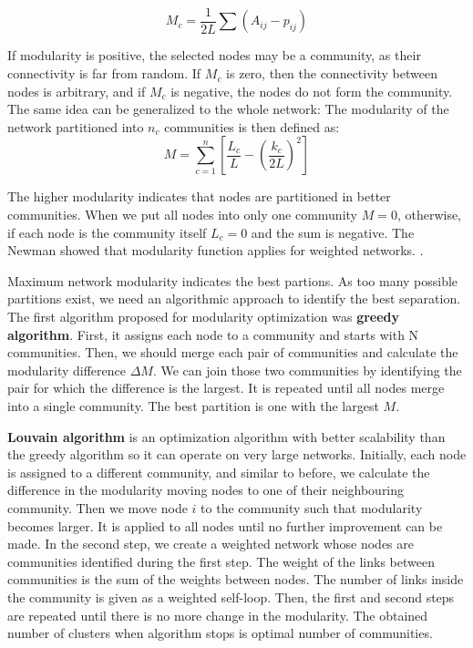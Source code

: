 \begin{equation}
M_c = \frac{1}{2L}\sum(A_{ij}-p_{ij})
\end{equation}

If modularity is positive, the selected nodes may be a community, as their connectivity is far from random. If $M_c$ is zero, then the connectivity between nodes is arbitrary, and if $M_c$ is negative, the nodes do not form the community.  The same idea can be generalized to the whole network: The modularity of the network partitioned into $n_c$ communities is then defined as:
\begin{equation}
M=\sum_{c=1}^{n} [\frac{L_c}{L} - (\frac{k_c}{2L})^2]
\end{equation}

The higher modularity indicates that nodes are partitioned in better communities. When we put all nodes into only one community $M=0$, otherwise, if each node is the community itself $L_c=0$ and the sum is negative. The Newman showed that modularity function applies for weighted networks. \cite{newman2004analysis}.

Maximum network modularity indicates the best partions. As too many possible partitions exist, we need an algorithmic approach to identify the best separation. The first algorithm proposed for modularity optimization was \textbf{greedy algorithm}. First, it assigns each node to a community and starts with N communities. Then, we should merge each pair of communities and calculate the modularity difference $\Delta M$. We can join those two communities by identifying the pair for which the difference is the largest. It is repeated until all nodes merge into a single community. The best partition is one with the largest $M$.

\textbf{Louvain algorithm} \cite{blondel2008fast} is an optimization algorithm with better scalability than the greedy algorithm so it can operate on very large networks. Initially, each node is assigned to a different community, and similar to before, we calculate the difference in the modularity moving nodes to one of their neighbouring community. Then we move node $i$ to the community such that modularity becomes larger. It is applied to all nodes until no further improvement can be made. In the second step, we create a weighted network whose nodes are communities identified during the first step. The weight of the links between communities is the sum of the weights between nodes. The number of links inside the community is given as a weighted self-loop. Then, the first and second steps are repeated until there is no more change in the modularity. The obtained number of clusters when algorithm stops is optimal number of communities. 

